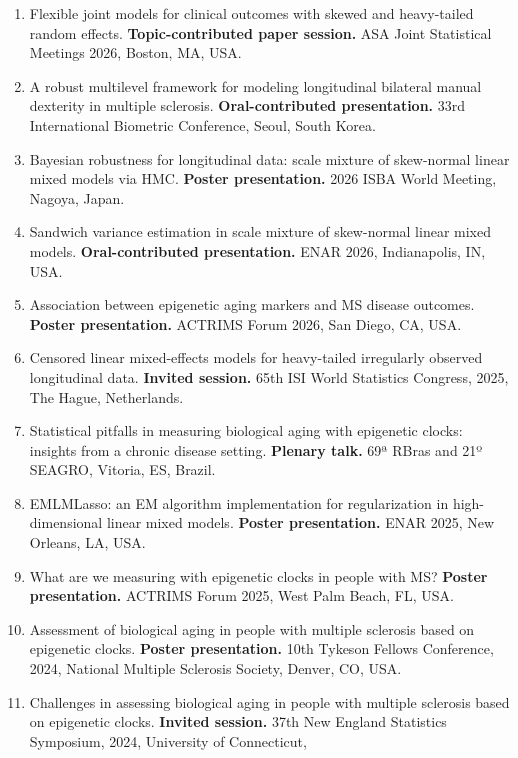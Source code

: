 \documentclass[
  10pt,
  letterpaper,
]{article}
\providecommand{\tightlist}{%
  \setlength{\itemsep}{0pt}\setlength{\parskip}{0pt}}
\begin{document}
\begin{enumerate}
\def\labelenumi{\arabic{enumi}.}
\tightlist
\item
  Flexible joint models for clinical outcomes with skewed and
  heavy-tailed random effects. \textbf{Topic-contributed paper session.}
  ASA Joint Statistical Meetings 2026, Boston, MA, USA.
\item
  A robust multilevel framework for modeling longitudinal bilateral
  manual dexterity in multiple sclerosis. \textbf{Oral-contributed
  presentation.} 33rd International Biometric Conference, Seoul, South
  Korea.
\item
  Bayesian robustness for longitudinal data: scale mixture of
  skew-normal linear mixed models via HMC. \textbf{Poster presentation.}
  2026 ISBA World Meeting, Nagoya, Japan.
\item
  Sandwich variance estimation in scale mixture of skew-normal linear
  mixed models. \textbf{Oral-contributed presentation.} ENAR 2026,
  Indianapolis, IN, USA.
\item
  Association between epigenetic aging markers and MS disease outcomes.
  \textbf{Poster presentation.} ACTRIMS Forum 2026, San Diego, CA, USA.
\item
  Censored linear mixed-effects models for heavy-tailed irregularly
  observed longitudinal data. \textbf{Invited session.} 65th ISI World
  Statistics Congress, 2025, The Hague, Netherlands.
\item
  Statistical pitfalls in measuring biological aging with epigenetic
  clocks: insights from a chronic disease setting. \textbf{Plenary
  talk.} 69ª RBras and 21º SEAGRO, Vitoria, ES, Brazil.
\item
  EMLMLasso: an EM algorithm implementation for regularization in
  high-dimensional linear mixed models. \textbf{Poster presentation.}
  ENAR 2025, New Orleans, LA, USA.
\item
  What are we measuring with epigenetic clocks in people with MS?
  \textbf{Poster presentation.} ACTRIMS Forum 2025, West Palm Beach, FL,
  USA.
\item
  Assessment of biological aging in people with multiple sclerosis based
  on epigenetic clocks. \textbf{Poster presentation.} 10th Tykeson
  Fellows Conference, 2024, National Multiple Sclerosis Society, Denver,
  CO, USA.
\item
  Challenges in assessing biological aging in people with multiple
  sclerosis based on epigenetic clocks. \textbf{Invited session.} 37th
  New England Statistics Symposium, 2024, University of Connecticut,

\end{enumerate}
\end{document}
